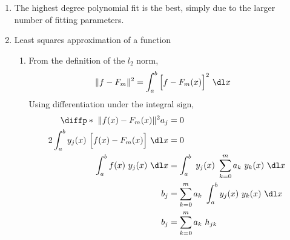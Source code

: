\begin{enumerate}
    \item The highest degree polynomial fit is the best, simply due to the larger
          number of fitting parameters.
          \begin{figure}[H]
              \centering
              \anitableonethree
          \end{figure}

    \item Least squares approximation of a function
          \begin{enumerate}
              \item From the definition of the $ l_2 $ norm,
                    \begin{align}
                        \lVert f - F_m \rVert^2 &
                        = \int_{a}^{b} \Big[f - F_m(x)\Big]^2\ \dl x
                    \end{align}
                    Using differentiation under the integral sign,
                    \begin{align}
                        \diffp*{\ \lVert f(x) - F_m(x) \rVert^2}{a_j}        & = 0 \\
                        2\int_{a}^{b} y_j(x)\ \Big[f(x) - F_m(x)\Big]\ \dl x & = 0 \\
                        \int_{a}^{b} f(x)\ y_j(x)\ \dl x                     &
                        = \int_{a}^{b}\ y_j(x)\ \sum_{k=0}^{m} a_k\ y_k(x)\ \dl x  \\
                        b_j                                                  &
                        = \sum_{k=0}^{m}a_k\ \int_{a}^{b}y_j(x)\ y_k(x)\ \dl x     \\
                        b_j                                                  &
                        = \sum_{k=0}^{m} a_k\ h_{jk}
                    \end{align}


\end{enumerate}
\end{enumerate}
